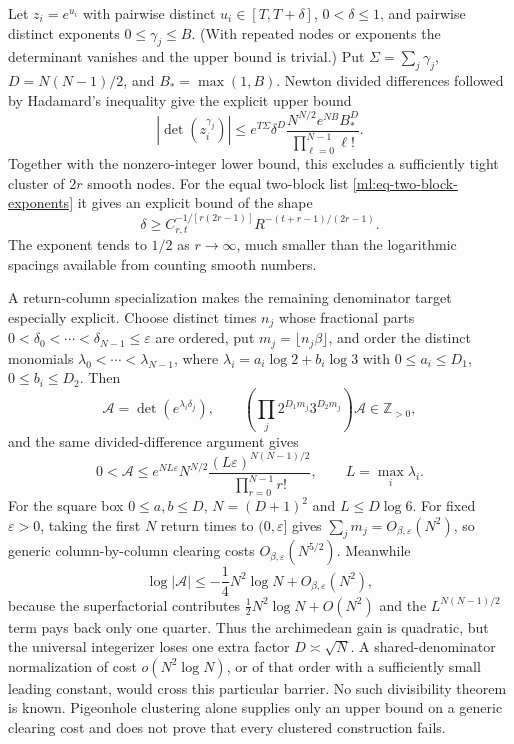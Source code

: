 \documentclass[11pt,oneside]{article}
\theoremstyle{definition}
\theoremstyle{remark}
\begin{document}
Let $z_i=e^{u_i}$ with pairwise distinct $u_i\in[T,T+\delta]$, $0<\delta\le1$, and
pairwise distinct exponents $0\le\gamma_j\le B$.  (With repeated nodes or exponents the
determinant vanishes and the upper bound is trivial.)  Put $\Sigma=\sum_j\gamma_j$,
$D=N(N-1)/2$, and $B_*=\max(1,B)$.  Newton divided differences followed by Hadamard's
inequality give the explicit upper bound
\begin{equation}
 \left|\det(z_i^{\gamma_j})\right|
 \le e^{T\Sigma}\delta^D
 \frac{N^{N/2}e^{NB}B_*^D}{\prod_{\ell=0}^{N-1}\ell!}.
 \label{ml:eq-alternant-upper}
\end{equation}
Together with the nonzero-integer lower bound, this excludes a sufficiently tight cluster of
$2r$ smooth nodes.  For the equal two-block list
\eqref{ml:eq-two-block-exponents} it gives an explicit bound of the shape
\[
 \delta\ge C_{r,t}^{-1/[r(2r-1)]}
 R^{-(t+r-1)/(2r-1)}.
\]
The exponent tends to $1/2$ as $r\to\infty$, much smaller than the logarithmic spacings
available from counting smooth numbers.

A return-column specialization makes the remaining denominator target especially explicit.
Choose distinct times $n_j$ whose fractional parts
$0<\delta_0<\cdots<\delta_{N-1}\le\varepsilon$ are ordered, put
$m_j=\lfloor n_j\beta\rfloor$, and order the distinct monomials
$\lambda_0<\cdots<\lambda_{N-1}$, where
$\lambda_i=a_i\log2+b_i\log3$ with
$0\le a_i\le D_1$, $0\le b_i\le D_2$.  Then
\begin{equation}
 \mathcal A=\det(e^{\lambda_i\delta_j}),\qquad
 \left(\prod_j2^{D_1m_j}3^{D_2m_j}\right)\mathcal A\in\mathbb Z_{>0},
 \label{ml:eq-return-alternant}
\end{equation}
and the same divided-difference argument gives
\begin{equation}
 0<\mathcal A\le e^{NL\varepsilon}N^{N/2}
 \frac{(L\varepsilon)^{N(N-1)/2}}{\prod_{r=0}^{N-1}r!},
 \qquad L=\max_i\lambda_i.
 \label{ml:eq-return-alternant-upper}
\end{equation}
For the square box $0\le a,b\le D$, $N=(D+1)^2$ and $L\le D\log6$.
For fixed $\varepsilon>0$, taking the first $N$ return times to $(0,\varepsilon]$ gives
$\sum_jm_j=O_{\beta,\varepsilon}(N^2)$, so generic
column-by-column clearing costs $O_{\beta,\varepsilon}(N^{5/2})$.  Meanwhile
\[
 \log|\mathcal A|\le-\frac14N^2\log N+O_{\beta,\varepsilon}(N^2),
\]
because the superfactorial contributes $\frac12N^2\log N+O(N^2)$ and the
$L^{N(N-1)/2}$ term pays back only one quarter.  Thus the archimedean gain is quadratic,
but the universal integerizer loses one extra factor $D\asymp\sqrt N$.  A shared-denominator
normalization of cost $o(N^2\log N)$, or of that order with a sufficiently small leading
constant, would cross this particular barrier.  No such divisibility theorem is known.
Pigeonhole clustering alone supplies only an upper bound on a generic clearing cost and does
not prove that every clustered construction fails.
\end{document}
